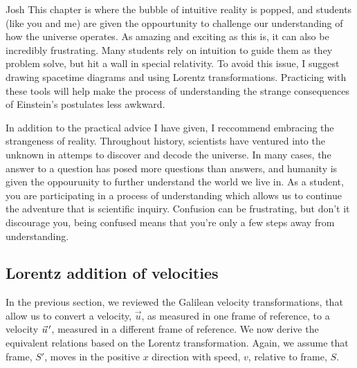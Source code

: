 \begin{studentOpinion}{Josh}{}
	This chapter is where the bubble of intuitive reality is popped, and students (like you and me) are given the oppourtunity to challenge our understanding of how the universe operates. As amazing and exciting as this is, it can also be incredibly frustrating. Many students rely on intuition to guide them as they problem solve, but hit a wall in special relativity. To avoid this issue, I suggest drawing spacetime diagrams and using Lorentz transformations. Practicing with these tools will help make the process of understanding the strange consequences of Einstein's postulates less awkward. 
	
	In addition to the practical advice I have given, I reccommend embracing the strangeness of reality. Throughout history, scientists have ventured into the unknown in attemps to discover and decode the universe. In many cases, the answer to a question has posed more questions than answers, and humanity is given the oppourunity to further understand the world we live in. As a student, you are participating in a process of understanding which allows us to continue the adventure that is scientific inquiry. Confusion can be frustrating, but don't it discourage you, being confused means that you're only a few steps away from understanding. 
\end{studentOpinion}

\subsection{Lorentz addition of velocities}
In the previous section, we reviewed the Galilean velocity transformations, that allow us to convert a velocity, $\vec u$, as measured in one frame of reference, to a velocity $\pvec u'$, measured in a different frame of reference. We now derive the equivalent relations based on the Lorentz transformation. Again, we assume that frame, $S'$, moves in the positive $x$ direction with speed, $v$, relative to frame, $S$. 

